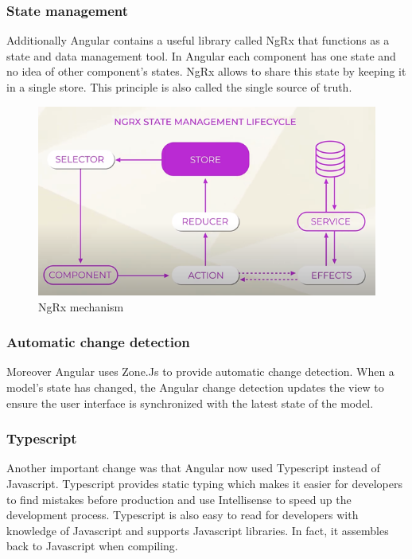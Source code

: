 \subsubsection{State management}
Additionally Angular contains a useful library called NgRx that functions as a state and data management tool. In Angular each component has one state and no idea of other component's states. NgRx allows to share this state by keeping it in a single store. This principle is also called the single source of truth.
\autocite{AltexSoft}
\begin{figure}[h!]
    \caption{NgRx mechanism}
    \centering
    \includegraphics[width=\textwidth]{img/ngrx.png} 
\end{figure}

\subsubsection{Automatic change detection}
Moreover Angular uses Zone.Js to provide automatic change detection. When a model's state has changed, the Angular change detection updates the view to ensure the user interface is synchronized with the latest state of the model.
\autocite{Kumar2020}

\subsubsection{Typescript}
Another important change was that Angular now used Typescript instead of Javascript. Typescript provides static typing which makes it easier for developers to find mistakes before production and use Intellisense to speed up the development process. Typescript is also easy to read for developers with knowledge of Javascript and supports Javascript libraries. In fact, it assembles back to Javascript when compiling.
\autocite{Typescriptlang}

